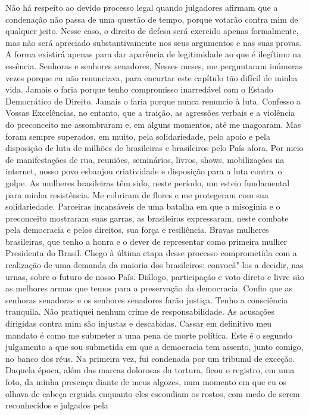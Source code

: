 Não há respeito ao devido processo legal quando julgadores afirmam que a
condenação não passa de uma questão de tempo, porque votarão contra mim
de qualquer jeito. Nesse caso, o direito de defesa será exercido apenas
formalmente, mas não será apreciado substantivamente nos seus argumentos
e nas suas provas. A forma existirá apenas para dar aparência de
legitimidade ao que é ilegítimo na essência. Senhoras e senhores
senadores, Nesses meses, me perguntaram inúmeras vezes porque eu não
renunciava, para encurtar este capítulo tão difícil de minha vida.
Jamais o faria porque tenho compromisso inarredável com o Estado
Democrático de Direito. Jamais o faria porque nunca renuncio à luta.
Confesso a Vossas Excelências, no entanto, que a traição, as agressões
verbais e a violência do preconceito me assombraram e, em alguns
momentos, até me magoaram. Mas foram sempre superados, em muito, pela
solidariedade, pelo apoio e pela disposição de luta de milhões de
brasileiras e brasileiros pelo País afora. Por meio de manifestações de
rua, reuniões, seminários, livros, shows, mobilizações na internet,
nosso povo esbanjou criatividade e disposição para a luta contra~o
golpe. As mulheres brasileiras têm sido, neste período, um esteio
fundamental para minha resistência. Me cobriram de flores e me
protegeram com sua solidariedade. Parceiras incansáveis de uma batalha
em que a misoginia e o preconceito mostraram suas garras, as brasileiras
expressaram, neste combate pela democracia e pelos direitos, sua força e
resiliência. Bravas mulheres brasileiras, que tenho a honra e o dever de
representar como primeira mulher Presidenta do Brasil. Chego à última
etapa desse processo comprometida com a realização de uma demanda da
maioria dos brasileiros: convocá"-los a decidir, nas urnas, sobre o
futuro de nosso País. Diálogo, participação e voto direto e livre são as
melhores armas que temos para a preservação da democracia. Confio que as
senhoras senadoras e os senhores senadores farão justiça. Tenho a
consciência tranquila. Não pratiquei nenhum crime de responsabilidade.
As acusações dirigidas contra mim são injustas e descabidas. Cassar em
definitivo meu mandato é como me submeter a uma pena de morte política.
Este é o segundo julgamento a que sou submetida em que a democracia tem
assento, junto comigo, no banco dos réus. Na primeira vez, fui condenada
por um tribunal de exceção. Daquela época, além das marcas dolorosas da
tortura, ficou o registro, em uma foto, da minha presença diante de meus
algozes, num momento em que eu os olhava de cabeça erguida enquanto eles
escondiam os rostos, com medo de serem reconhecidos e julgados pela
